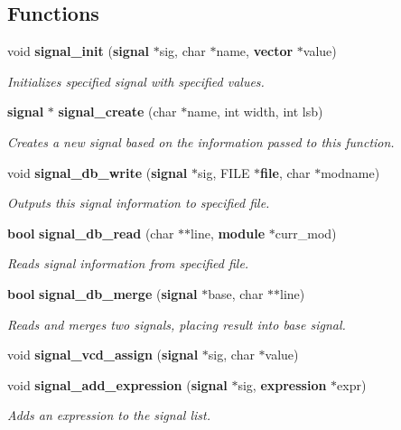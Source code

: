 \subsection*{Functions}
\begin{CompactItemize}
\item 
void {\bf signal\_\-init} ({\bf signal} $\ast$sig, char $\ast$name, {\bf vector} $\ast$value)
\begin{CompactList}\small\item\em Initializes specified signal with specified values.\item\end{CompactList}\item 
{\bf signal} $\ast$ {\bf signal\_\-create} (char $\ast$name, int width, int lsb)
\begin{CompactList}\small\item\em Creates a new signal based on the information passed to this function.\item\end{CompactList}\item 
void {\bf signal\_\-db\_\-write} ({\bf signal} $\ast$sig, FILE $\ast${\bf file}, char $\ast$modname)
\begin{CompactList}\small\item\em Outputs this signal information to specified file.\item\end{CompactList}\item 
{\bf bool} {\bf signal\_\-db\_\-read} (char $\ast$$\ast$line, {\bf module} $\ast$curr\_\-mod)
\begin{CompactList}\small\item\em Reads signal information from specified file.\item\end{CompactList}\item 
{\bf bool} {\bf signal\_\-db\_\-merge} ({\bf signal} $\ast$base, char $\ast$$\ast$line)
\begin{CompactList}\small\item\em Reads and merges two signals, placing result into base signal.\item\end{CompactList}\item 
void {\bf signal\_\-vcd\_\-assign} ({\bf signal} $\ast$sig, char $\ast$value)
\item 
void {\bf signal\_\-add\_\-expression} ({\bf signal} $\ast$sig, {\bf expression} $\ast$expr)
\begin{CompactList}\small\item\em Adds an expression to the signal list.\item\end{CompactList}\item 

\end{CompactItemize}
